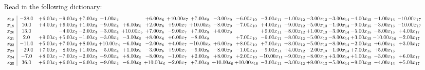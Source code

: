 \documentclass[9pt]{article}
\begin{document}
Read in the following dictionary:
\[\begin{array}{c| c c@{\hskip 2pt} c@{\hskip 2pt} c@{\hskip 2pt} c@{\hskip 2pt} c@{\hskip 2pt} c@{\hskip 2pt} c@{\hskip 2pt} c@{\hskip 2pt} c@{\hskip 2pt} c@{\hskip 2pt} c@{\hskip 2pt} c@{\hskip 2pt} c@{\hskip 2pt} c@{\hskip 2pt} c@{\hskip 2pt} c@{\hskip 2pt} c@{\hskip 2pt} }
 x_{18}   &  -28.0 & +  6.00 x_{1} & -9.00 x_{2} & +  7.00 x_{3} & -1.00 x_{4} &   & +  6.00 x_{6} & + 10.00 x_{7} & +  7.00 x_{8} & -3.00 x_{9} & -6.00 x_{10} & -3.00 x_{11} & -1.00 x_{12} & -3.00 x_{13} & -3.00 x_{14} & -4.00 x_{15} & -1.00 x_{16} & -10.00 x_{17}\\
 x_{19}   &  10.0 & +  4.00 x_{1} & +  6.00 x_{2} & +  1.00 x_{3} & -9.00 x_{4} & +  6.00 x_{5} & +  2.00 x_{6} & +  9.00 x_{7} & + 10.00 x_{8} & -8.00 x_{9} & -7.00 x_{10} & +  4.00 x_{11} & -9.00 x_{12} & -5.00 x_{13} & -1.00 x_{14} & -9.00 x_{15} & -3.00 x_{16} & -10.00 x_{17}\\
 x_{20}   &  13.0  &   & -4.00 x_{2} & -2.00 x_{3} & -3.00 x_{4} & + 10.00 x_{5} & +  7.00 x_{6} & -9.00 x_{7} & +  7.00 x_{8} & +  4.00 x_{9} &   & +  9.00 x_{11} & -8.00 x_{12} & +  1.00 x_{13} & -3.00 x_{14} & -5.00 x_{15} & -8.00 x_{16} & +  4.00 x_{17}\\
 x_{21}   &  2.0 & +  9.00 x_{1} & +  5.00 x_{2} & -1.00 x_{3} & +  3.00 x_{4} & -3.00 x_{5} & +  8.00 x_{6} & +  6.00 x_{7} & -8.00 x_{8} &   & +  7.00 x_{10} & -9.00 x_{11} & -8.00 x_{12} & -5.00 x_{13} & -8.00 x_{14} & +  3.00 x_{15} & -10.00 x_{16} & -2.00 x_{17}\\
 x_{22}   &  -11.0 & +  5.00 x_{1} & +  7.00 x_{2} & +  8.00 x_{3} & + 10.00 x_{4} & -6.00 x_{5} & -2.00 x_{6} & +  4.00 x_{7} & -10.00 x_{8} & +  6.00 x_{9} & +  8.00 x_{10} & +  7.00 x_{11} & +  8.00 x_{12} & -5.00 x_{13} & -8.00 x_{14} & -2.00 x_{15} & +  6.00 x_{16} & +  3.00 x_{17}\\
 x_{23}   &  -29.0 & +  7.00 x_{1} & -8.00 x_{2} & +  1.00 x_{3} & +  5.00 x_{4} & +  1.00 x_{5} & -3.00 x_{6} & +  9.00 x_{7} & -9.00 x_{8} & -8.00 x_{9} & -1.00 x_{10} & -9.00 x_{11} & +  4.00 x_{12} & -2.00 x_{13} & -1.00 x_{14} & +  7.00 x_{15} & +  5.00 x_{16} &   \\
 x_{24}   &  -7.0 & +  8.00 x_{1} & -7.00 x_{2} & -2.00 x_{3} & +  9.00 x_{4} & +  8.00 x_{5} & -8.00 x_{6} & -1.00 x_{7} & +  2.00 x_{8} & +  8.00 x_{9} & +  2.00 x_{10} & -10.00 x_{11} & -9.00 x_{12} & -8.00 x_{13} & +  3.00 x_{14} & +  1.00 x_{15} & -3.00 x_{16} & +  6.00 x_{17}\\
 x_{25}   &  36.0 & +  6.00 x_{1} & +  6.00 x_{2} & -6.00 x_{3} & -9.00 x_{4} & -6.00 x_{5} & + 10.00 x_{6} & -2.00 x_{7} & +  7.00 x_{8} & + 10.00 x_{9} & + 10.00 x_{10} & -3.00 x_{11} & -3.00 x_{12} & +  9.00 x_{13} & -5.00 x_{14} & -9.00 x_{15} & -4.00 x_{16} & +  5.00 x_{17}\\

\end{array}\]
\end{document}

